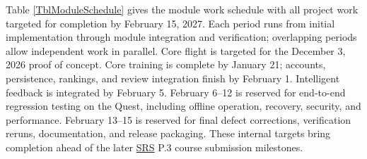 \documentclass[12pt, titlepage]{article}
\DeclareRobustCommand{\mgabbr}[2]{\hyperlink{mg-abbr:#1}{#2}}
\begin{document}
Table \ref{TblModuleSchedule} gives the module work schedule with all
project work targeted for completion by February 15, 2027. Each period
runs from initial implementation through module integration and
verification; overlapping periods allow independent work in parallel.
Core flight is targeted for the December 3, 2026 proof of concept.
Core training is complete by January 21; accounts, persistence, rankings,
and review integration finish by February 1. Intelligent feedback is
integrated by February 5. February 6--12 is reserved for end-to-end
regression testing on the Quest, including offline operation, recovery,
security, and performance. February 13--15 is reserved for final defect
corrections, verification reruns, documentation, and release packaging.
These internal targets bring completion ahead of the later \mgabbr{srs}{SRS} P.3
course
submission milestones.
\end{document}
